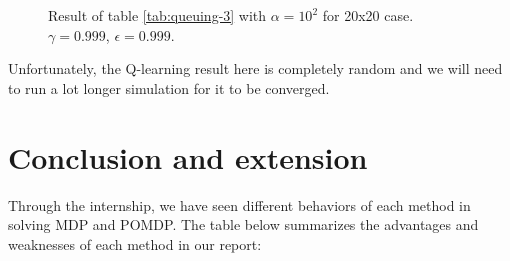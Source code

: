 \documentclass[
  a4paper, xcolor = usenames,dvipsnames]{article}
\theoremstyle{definition}
\theoremstyle{definition}
\theoremstyle{definition}
\theoremstyle{definition}
\theoremstyle{remark}
\begin{document}
\begin{figure}

{\centering {}

}

\caption{Result of table \ref{tab:queuing-3} with \(\alpha = 10^{2}\) for 20x20 case. \(\gamma = 0.999\), \(\epsilon = 0.999\).}\label{fig:20x20-lb-2}
\end{figure}

Unfortunately, the Q-learning result here is completely random and we will need to run a lot longer simulation for it to be converged.

\hypertarget{conclusion-and-extension}{%
\section{Conclusion and extension}\label{conclusion-and-extension}}

Through the internship, we have seen different behaviors of each method in solving MDP and POMDP. The table below summarizes the advantages and weaknesses of each method in our report:
\end{document}
